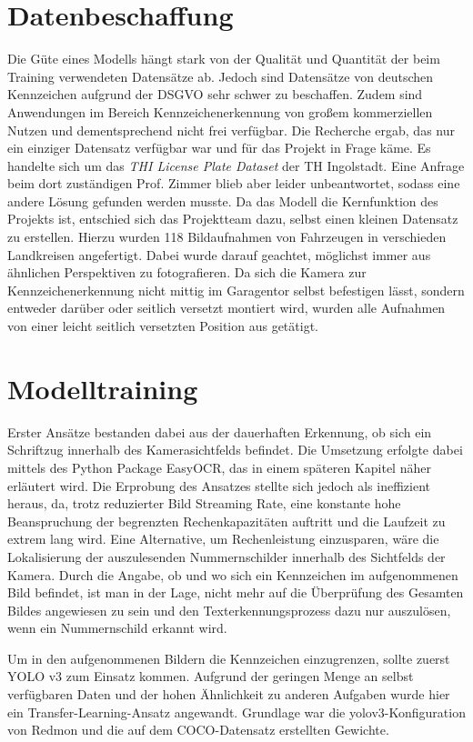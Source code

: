 \section{Datenbeschaffung}
Die Güte eines Modells hängt stark von der Qualität und Quantität der beim Training verwendeten Datensätze ab. Jedoch sind Datensätze von deutschen Kennzeichen aufgrund der \ac{DSGVO} sehr schwer zu beschaffen. Zudem sind Anwendungen im Bereich Kennzeichenerkennung von großem kommerziellen Nutzen und dementsprechend nicht frei verfügbar. Die Recherche ergab, das nur ein einziger Datensatz verfügbar war und für das Projekt in Frage käme. Es handelte sich um das \textit{THI License Plate Dataset} der TH Ingolstadt. Eine Anfrage beim dort zuständigen Prof. Zimmer blieb aber leider unbeantwortet, sodass eine andere Lösung gefunden werden musste.
Da das Modell die Kernfunktion des Projekts ist, entschied sich das Projektteam dazu, selbst einen kleinen Datensatz zu erstellen. 
Hierzu wurden 118 Bildaufnahmen von Fahrzeugen in verschieden Landkreisen angefertigt. Dabei wurde darauf geachtet, möglichst immer aus ähnlichen Perspektiven zu fotografieren. Da sich die Kamera zur Kennzeichenerkennung nicht mittig im Garagentor selbst befestigen lässt, sondern entweder darüber oder seitlich versetzt montiert wird, wurden alle Aufnahmen von einer leicht seitlich versetzten Position aus getätigt.

\section{Modelltraining}


Erster Ansätze bestanden dabei aus der dauerhaften Erkennung, ob sich ein Schriftzug innerhalb des Kamerasichtfelds befindet. Die Umsetzung erfolgte dabei mittels des Python Package EasyOCR, das in einem späteren Kapitel näher erläutert wird. Die Erprobung des Ansatzes stellte sich jedoch als ineffizient heraus, da, trotz reduzierter Bild Streaming Rate, eine konstante hohe Beanspruchung der begrenzten Rechenkapazitäten auftritt und die Laufzeit zu extrem lang wird.
Eine Alternative, um Rechenleistung einzusparen, wäre die Lokalisierung der auszulesenden Nummernschilder innerhalb des Sichtfelds der Kamera. Durch die Angabe, ob und wo sich ein Kennzeichen im aufgenommenen Bild befindet, ist man in der Lage, nicht mehr auf die Überprüfung des Gesamten Bildes angewiesen zu sein und den Texterkennungsprozess dazu nur auszulösen, wenn ein Nummernschild erkannt wird.

Um in den aufgenommenen Bildern die Kennzeichen einzugrenzen, sollte zuerst YOLO v3 zum Einsatz kommen. Aufgrund der geringen Menge an selbst verfügbaren Daten und der hohen Ähnlichkeit zu anderen Aufgaben wurde hier ein Transfer-Learning-Ansatz angewandt. Grundlage war die yolov3-Konfiguration von Redmon und die auf dem COCO-Datensatz erstellten Gewichte.

